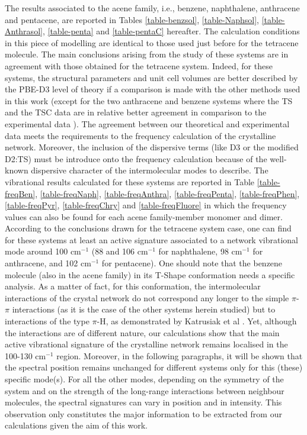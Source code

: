 The results associated to the acene family, i.e., benzene, naphthalene, anthracene and pentacene, are reported in Tables \ref{table-benzsol}, \ref{table-Naphsol}, \ref{table-Anthrasol}, \ref{table-penta} and \ref{table-pentaC} hereafter. The calculation conditions in this piece of modelling are identical to those used just before for the tetracene molecule. The main conclusions arising from the study of these systems are in agreement with those obtained for the tetracene system. Indeed, for these systems, the structural parameters and unit cell volumes are better described by the PBE-D3 level of theory if a comparison is made with the other methods used in this work (except for the two anthracene and benzene systems where the TS and the TSC data are in relative better agreement in comparison to the experimental data \cite{buvcko2013tkatchenko}). The agreement between our theoretical and experimental data meets the requirements to the frequency calculation of the crystalline network. Moreover, the inclusion of the dispersive terms (like D3 or the modified D2:TS) must be introduce onto the frequency calculation because of the well-known dispersive character of the intermolecular modes to describe. The vibrational results calculated for these systems are reported in Table \ref{table-freqBen}, \ref{table-freqNaph}, \ref{table-freqAnthra}, \ref{table-freqPenta}, \ref{table-freqPhen}, \ref{table-freqPyr}, \ref{table-freqChry} and \ref{table-freqFluore} in which the frequency values can also be found for each acene family-member monomer and dimer. According to the conclusions drawn for the tetracene system case, one can find for these systems at least an active signature associated to a network vibrational mode around 100 cm$^{-1}$ (88 and 106 cm$^{-1}$ for naphthalene, 98 cm$^{-1}$ for anthracene, and 102 cm$^{-1}$ for pentacene). One should note that the benzene molecule (also in the acene family) in its T-Shape conformation needs a specific analysis. As a matter of fact, for this conformation, the intermolecular interactions of the crystal network do not correspond any longer to the simple $\pi$-$\pi$ interactions (as it is the case of the other systems herein studied) but to interactions of the type $\pi$-H, as demonstrated by Katrusiak et al \cite{katrusiak2010association}. Yet, although the interactions are of different nature, our calculations show that the main active vibrational signature of the crystalline network remains localised in the 100-130 cm$^{-1}$ region. Moreover, in the following paragraphs, it will be shown that the spectral position remains unchanged for different systems only for this (these) specific mode(s). For all the other modes, depending on the symmetry of the system and on the strength of the long-range interactions between neighbour molecules, the spectral signatures can vary in position and in intensity. This observation only constitutes the major information to be extracted from our calculations given the aim of this work.	
 	
